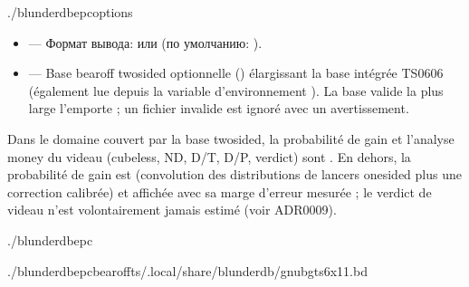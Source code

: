 \documentclass[letterpaper,10pt,russian]{sphinxmanual}
\begin{document}
\begin{sphinxVerbatim}[commandchars=\\\{\}]
./blunderdbepc\PYG{o}{[}options\PYG{o}{]}
\end{sphinxVerbatim}

\sphinxAtStartPar
{}
\begin{itemize}
\item {} 
\sphinxAtStartPar
{} — Формат вывода:  или  (по умолчанию: ).

\item {} 
\sphinxAtStartPar
{} — Base bearoff two\sphinxhyphen{}sided optionnelle () élargissant
la base intégrée TS\sphinxhyphen{}06\sphinxhyphen{}06 (également lue depuis la variable d’environnement
). La base valide la plus large l’emporte ; un fichier
invalide est ignoré avec un avertissement.

\end{itemize}

\sphinxAtStartPar
{} Dans le domaine couvert par la base two\sphinxhyphen{}sided, la probabilité de
gain et l’analyse money du videau (cubeless, ND, D/T, D/P, verdict) sont
. En dehors, la probabilité de gain est  (convolution
des distributions de lancers one\sphinxhyphen{}sided plus une correction calibrée) et
affichée avec sa marge d’erreur mesurée ; le verdict de videau n’est
volontairement jamais estimé (voir ADR\sphinxhyphen{}0009).

\sphinxAtStartPar
{}

\begin{sphinxVerbatim}[commandchars=\\\{\}]
./blunderdbepc

./blunderdbepc\PYGZhy{}\PYGZhy{}bearoff\PYGZhy{}ts\PYGZti{}/.local/share/blunderdb/gnubg\PYGZus{}ts6x11.bd
\end{sphinxVerbatim}
\end{document}
